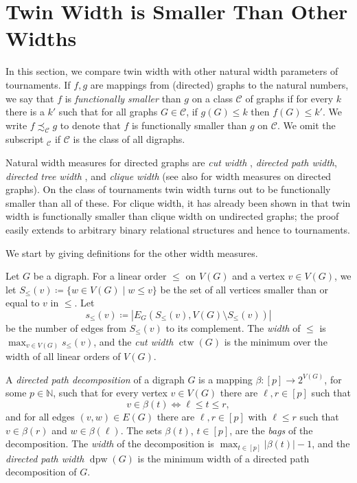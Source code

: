 \documentclass{theoretics}
\newcommand{\CC}{{\mathcal C}}
\newcommand{\NN}{{\mathbb N}}
\DeclareMathOperator{\dpw}{dpw}
\DeclareMathOperator{\ctw}{ctw}
\begin{document}
\section{Twin Width is Smaller Than Other Widths}
\label{sec:widths}

In this section, we compare twin width with other natural width parameters of tournaments.
If $f,g$ are mappings from (directed) graphs to the natural numbers, we say that $f$ is \emph{functionally smaller} than $g$ on a class $\CC$ of graphs if
for every $k$ there is a $k'$ such that for all graphs $G\in\CC$, if $g(G)\le k$ then $f(G)\le k'$.
We write $f\precsim_{\CC}g$ to denote that $f$ is functionally smaller than $g$ on $\CC$.
We omit the subscript ${}_{\CC}$ if $\CC$ is the class of all digraphs.

Natural width measures for directed graphs are \emph{cut width} \cite{ChudnovskyFS12}, \emph{directed path width}, \emph{directed tree width} \cite{JohnsonRST01}, and \emph{clique width} \cite{CourcelleO00} (see also \cite{Rehs22} for width measures on directed graphs).
On the class of tournaments twin width turns out to be functionally smaller than all of these.
For clique width, it has already been shown in \cite{BonnetKTW22} that twin width is functionally smaller than clique width on undirected graphs; the proof easily extends to arbitrary binary relational structures and hence to tournaments.

We start by giving definitions for the other width measures.

Let $G$ be a digraph.
For a linear order $\leq$ on $V(G)$ and a vertex $v \in V(G)$, we let $S_\leq(v) \coloneqq \{w \in V(G) \mid w \leq v\}$ be the set of all vertices smaller than or equal to $v$ in $\leq$.
Let
\[s_\leq(v) \coloneqq |E_G(S_\leq(v),V(G)\setminus S_\leq(v))|\]
be the number of edges from $S_\le(v)$ to its complement.
The \emph{width} of $\leq$ is $\max_{v\in V(G)} s_\leq(v)$, and the \emph{cut width} $\ctw(G)$ is the minimum over the width of all linear orders of $V(G)$.

A \emph{directed path decomposition} of a digraph $G$ is a mapping $\beta\colon[p] \to 2^{V(G)}$, for some $p\in\NN$, such that
for every vertex $v\in V(G)$ there are $\ell,r \in [p]$ such that
\[v \in\beta(t) \iff \ell \leq t \leq r,\]
and for all edges $(v,w)\in E(G)$ there are $\ell,r \in [p]$ with $\ell \leq r$ such that $v \in \beta(r)$ and $w \in \beta(\ell)$.
The sets $\beta(t)$, $t \in [p]$, are the \emph{bags} of the decomposition.
The \emph{width} of the decomposition is $\max_{t \in [p]}|\beta(t)|-1$,
and the \emph{directed path width} $\dpw(G)$ is the minimum width of a directed path decomposition of $G$.
\end{document}
